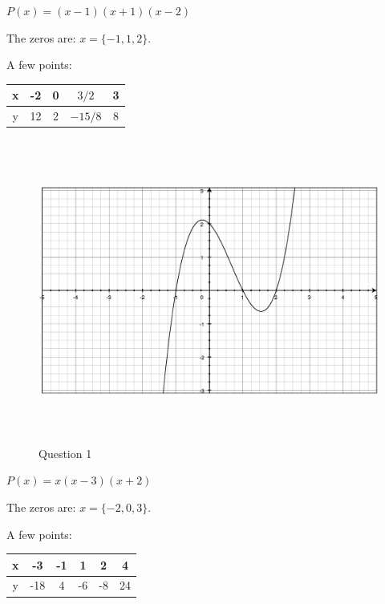 \documentclass[fleqn,addpoints]{exam}
\begin{document}
\begin{questions}

\question $P(x) = (x-1)(x+1)(x-2)$
\label{graph:first} 

\begin{solution}

The zeros are: $x = \{-1, 1, 2\}$.

A few points:
\begin{tabular}{|c|c|c|c|c|}
\hline
  x & -2 & 0 & $3/2$   & 3 \\
\hline
  y & 12 & 2 & $-15/8$ & 8 \\
\hline
\end{tabular}

\begin{figure}[H]
  \centering
  \includegraphics[width=14cm,height=10cm]{question_1.eps}
  \caption*{Question 1}
\end{figure}

\end{solution}

\ifprintanswers
\pagebreak
\else
\fi

\question $P(x) = x(x-3)(x+2)$
\begin{solution}

The zeros are: $x = \{ -2, 0, 3 \}$.

A few points:
\begin{tabular}{|c|c|c|c|c|c|}
\hline
  x & -3  & -1 &  1 & 2  & 4 \\
\hline
  y & -18 & 4 & -6 & -8 & 24 \\
\hline
\end{tabular}


\end{solution}
\end{questions}
\end{document}
